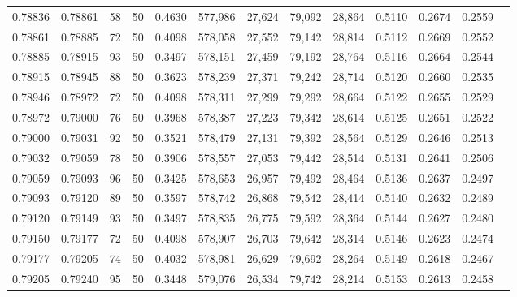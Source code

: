 \begin{tabular}{rrrrrrrrrrrrr}
0.78836 & 0.78861 &    58 &  50 &                                     0.4630 & 577,986 &  27,624 &  79,092 &  28,864 & 0.5110 & 0.2674 & 0.2559 \\
0.78861 & 0.78885 &    72 &  50 &                                     0.4098 & 578,058 &  27,552 &  79,142 &  28,814 & 0.5112 & 0.2669 & 0.2552 \\
0.78885 & 0.78915 &    93 &  50 &                                     0.3497 & 578,151 &  27,459 &  79,192 &  28,764 & 0.5116 & 0.2664 & 0.2544 \\
0.78915 & 0.78945 &    88 &  50 &                                     0.3623 & 578,239 &  27,371 &  79,242 &  28,714 & 0.5120 & 0.2660 & 0.2535 \\
0.78946 & 0.78972 &    72 &  50 &                                     0.4098 & 578,311 &  27,299 &  79,292 &  28,664 & 0.5122 & 0.2655 & 0.2529 \\
0.78972 & 0.79000 &    76 &  50 &                                     0.3968 & 578,387 &  27,223 &  79,342 &  28,614 & 0.5125 & 0.2651 & 0.2522 \\
0.79000 & 0.79031 &    92 &  50 &                                     0.3521 & 578,479 &  27,131 &  79,392 &  28,564 & 0.5129 & 0.2646 & 0.2513 \\
0.79032 & 0.79059 &    78 &  50 &                                     0.3906 & 578,557 &  27,053 &  79,442 &  28,514 & 0.5131 & 0.2641 & 0.2506 \\
0.79059 & 0.79093 &    96 &  50 &                                     0.3425 & 578,653 &  26,957 &  79,492 &  28,464 & 0.5136 & 0.2637 & 0.2497 \\
0.79093 & 0.79120 &    89 &  50 &                                     0.3597 & 578,742 &  26,868 &  79,542 &  28,414 & 0.5140 & 0.2632 & 0.2489 \\
0.79120 & 0.79149 &    93 &  50 &                                     0.3497 & 578,835 &  26,775 &  79,592 &  28,364 & 0.5144 & 0.2627 & 0.2480 \\
0.79150 & 0.79177 &    72 &  50 &                                     0.4098 & 578,907 &  26,703 &  79,642 &  28,314 & 0.5146 & 0.2623 & 0.2474 \\
0.79177 & 0.79205 &    74 &  50 &                                     0.4032 & 578,981 &  26,629 &  79,692 &  28,264 & 0.5149 & 0.2618 & 0.2467 \\
0.79205 & 0.79240 &    95 &  50 &                                     0.3448 & 579,076 &  26,534 &  79,742 &  28,214 & 0.5153 & 0.2613 & 0.2458 \\

\end{tabular}
